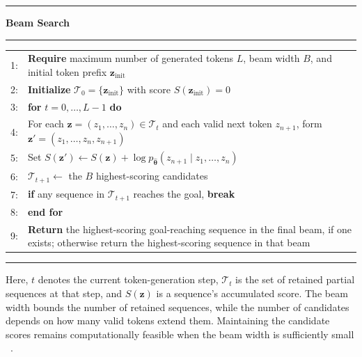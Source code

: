 ﻿\documentclass[12pt,a4paper]{article}
\let\oldcite\cite
\renewcommand{\cite}[1]{\mbox{\oldcite{#1}}}
\theoremstyle{definition}
\newcommand{\minorheading}[1]{%
	\Needspace{5\baselineskip}%
	\textbf{#1}\par
}
\begin{document}
\begin{center}
\begin{minipage}{0.9\linewidth}
\begin{flushleft}
\hrule
\vspace{0.3em}
\minorheading{Beam Search~\cite{janner2021trajectory}}
\vspace{0.3em}
\hrule
\vspace{0.6em}

\begin{tabular}{r p{}}
1: & \textbf{Require} maximum number of generated tokens $L$, beam width $B$, and initial token prefix $\boldsymbol{z}_{\mathrm{init}}$ \\[0.3em]
2: & \textbf{Initialize} $\mathcal{T}_0=\{\boldsymbol{z}_{\mathrm{init}}\}$ with score $S(\boldsymbol{z}_{\mathrm{init}})=0$ \\[0.3em]
3: & \textbf{for} $t=0,\dots,L-1$ \textbf{do} \\[0.3em]
4: & \hspace*{1.5em}For each $\boldsymbol{z}=(z_1,\dots,z_n)\in\mathcal{T}_t$ and each valid next token $z_{n+1}$, form $\boldsymbol{z}'=(z_1,\dots,z_n,z_{n+1})$ \\[0.3em]
5: & \hspace*{1.5em}Set $S(\boldsymbol{z}')\leftarrow S(\boldsymbol{z})+\log p_{\hat{\boldsymbol{\theta}}}(z_{n+1}\mid z_1,\dots,z_n)$ \\[0.3em]
6: & \hspace*{1.5em}$\mathcal{T}_{t+1}\leftarrow$ the $B$ highest-scoring candidates \\[0.3em]
7: & \hspace*{1.5em}\textbf{if} any sequence in $\mathcal{T}_{t+1}$ reaches the goal, \textbf{break} \\[0.3em]
8: & \textbf{end for} \\[0.3em]
9: & \textbf{Return} the highest-scoring goal-reaching sequence in the final beam, if one exists; otherwise return the highest-scoring sequence in that beam
\end{tabular}

\vspace{0.6em}
\hrule
\end{flushleft}
\end{minipage}
\captionsetup{type=lstlisting}
\label{lst:beam_search_pseudocode}
\end{center}
Here, $t$ denotes the current token-generation step, $\mathcal{T}_t$ is the set of retained partial
sequences at that step, and $S(\boldsymbol{z})$ is a sequence's accumulated score.
The beam width bounds the number of retained sequences, while the number of candidates
depends on how many valid tokens extend them. Maintaining the candidate scores remains computationally
feasible when the beam width is sufficiently small
~\cite{jurafsky2026speech}.
\end{document}
